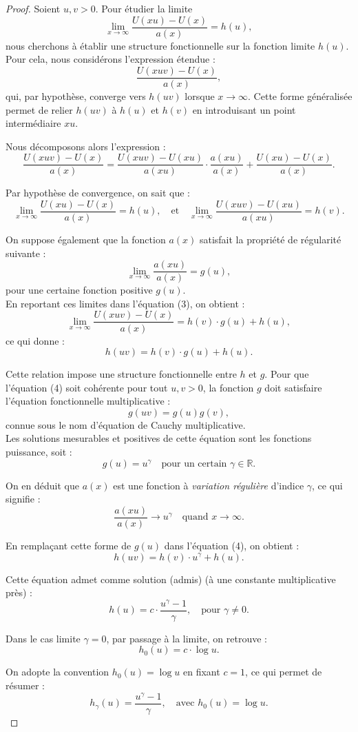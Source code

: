 \documentclass{article}
\theoremstyle{plain}
\theoremstyle{definition}
\theoremstyle{plain}
\begin{document}
\vspace{0.5cm}

\begin{proof} 
Soient $u, v > 0$. Pour étudier la limite
\[
\lim_{x \to \infty} \frac{U(xu) - U(x)}{a(x)} = h(u),
\]
nous cherchons à établir une structure fonctionnelle sur la fonction limite $h(u)$. \\

\noindent Pour cela, nous considérons l’expression étendue :
\[
\frac{U(xuv) - U(x)}{a(x)},
\]
qui, par hypothèse, converge vers $h(uv)$ lorsque $x \to \infty$. Cette forme généralisée permet de relier $h(uv)$ à $h(u)$ et $h(v)$ en introduisant un point intermédiaire $xu$.

\noindent Nous décomposons alors l’expression :
\[
\frac{U(xuv) - U(x)}{a(x)} =
\frac{U(xuv) - U(xu)}{a(xu)} \cdot \frac{a(xu)}{a(x)} +
\frac{U(xu) - U(x)}{a(x)}.
\tag{3}
\]

\noindent Par hypothèse de convergence, on sait que :
\[
\lim_{x \to \infty} \frac{U(xu) - U(x)}{a(x)} = h(u),
\quad \text{et} \quad
\lim_{x \to \infty} \frac{U(xuv) - U(xu)}{a(xu)} = h(v).
\]

\noindent On suppose également que la fonction $a(x)$ satisfait la propriété de régularité suivante :
\[
\lim_{x \to \infty} \frac{a(xu)}{a(x)} = g(u),
\]
pour une certaine fonction positive $g(u)$. \\

\noindent En reportant ces limites dans l'équation (3), on obtient :
\[
\lim_{x \to \infty} \frac{U(xuv) - U(x)}{a(x)} = h(v) \cdot g(u) + h(u),
\]
ce qui donne :
\[
h(uv) = h(v) \cdot g(u) + h(u).
\tag{4}
\]

\noindent Cette relation impose une structure fonctionnelle entre $h$ et $g$. Pour que l'équation (4) soit cohérente pour tout $u, v > 0$, la fonction $g$ doit satisfaire l'équation fonctionnelle multiplicative :
\[
g(uv) = g(u) g(v),
\]
connue sous le nom d’équation de Cauchy multiplicative. \\

\noindent Les solutions mesurables et positives de cette équation sont les fonctions puissance, soit :
\[
g(u) = u^{\gamma} \quad \text{pour un certain } \gamma \in \mathbb{R}.
\]

\noindent On en déduit que $a(x)$ est une fonction à \textit{variation régulière} d’indice $\gamma$, ce qui signifie :
\[
\frac{a(xu)}{a(x)} \longrightarrow u^\gamma \quad \text{quand } x \to \infty.
\]

\noindent En remplaçant cette forme de $g(u)$ dans l’équation (4), on obtient :
\[
h(uv) = h(v) \cdot u^\gamma + h(u).
\]

\noindent Cette équation admet comme solution (admis) (à une constante multiplicative près) :
\[
h(u) = c \cdot \frac{u^\gamma - 1}{\gamma}, \quad \text{pour } \gamma \neq 0.
\]

\noindent Dans le cas limite $\gamma = 0$, par passage à la limite, on retrouve :
\[
h_0(u) = c \cdot \log u.
\]

\noindent On adopte la convention $h_0(u) = \log u$ en fixant $c = 1$, ce qui permet de résumer :
\[
h_\gamma(u) = \frac{u^\gamma - 1}{\gamma}, \quad \text{avec } h_0(u) = \log u.
\]

\end{proof}	
\end{document}

